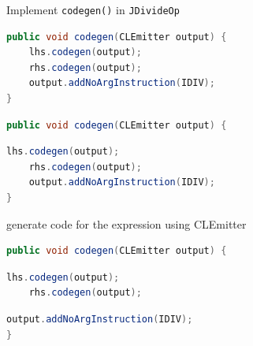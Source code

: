 \documentclass[8pt,a4paper,compress]{beamer}
\begin{document}
\begin{frame}[fragile]
\pause

Implement \lstinline{codegen()} in \lstinline{JDivideOp}

\smallskip

\begin{overprint}

\begin{tcolorbox}[enhanced,drop shadow southwest,sharp corners,size=fbox,colback=white,fontlower=\small\ttfamily,collower=silver900]

\begin{lstlisting}[language=Java,style=focusin]
public void codegen(CLEmitter output) {
    lhs.codegen(output);
    rhs.codegen(output);
    output.addNoArgInstruction(IDIV);
}
\end{lstlisting}

\tcblower
\begin{minipage}[t][.25cm][t]{\textwidth}

\end{minipage}
\end{tcolorbox}

\begin{tcolorbox}[enhanced,drop shadow southwest,sharp corners,size=fbox,colback=white,fontlower=\small\ttfamily,collower=silver900]

\begin{lstlisting}[language=Java,style=focusin,backgroundcolor=\color{lime100}]
public void codegen(CLEmitter output) {
\end{lstlisting}
\begin{lstlisting}[language=Java,style=focusout]
    lhs.codegen(output);
    rhs.codegen(output);
    output.addNoArgInstruction(IDIV);
}
\end{lstlisting}

\tcblower
\begin{minipage}[t][.25cm][t]{\textwidth}
generate code for the expression using CLEmitter
\end{minipage}
\end{tcolorbox}

\begin{tcolorbox}[enhanced,drop shadow southwest,sharp corners,size=fbox,colback=white,fontlower=\small\ttfamily,collower=silver900]

\begin{lstlisting}[language=Java,style=focusout]
public void codegen(CLEmitter output) {
\end{lstlisting}
\begin{lstlisting}[language=Java,style=focusin,backgroundcolor=\color{lime100}]
    lhs.codegen(output);
    rhs.codegen(output);
\end{lstlisting}
\begin{lstlisting}[language=Java,style=focusout]
    output.addNoArgInstruction(IDIV);
}
\end{lstlisting}


\end{tcolorbox}
\end{overprint}
\end{frame}
\end{document}
